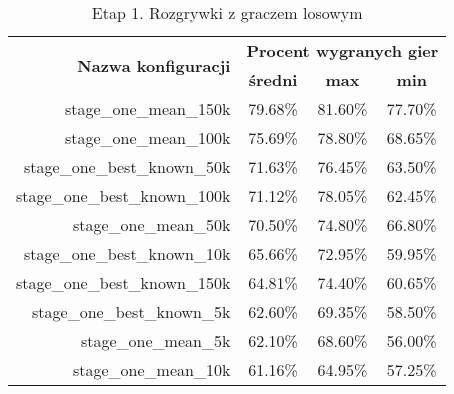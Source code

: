 \begin{longtable}[c]{|r|c|c|c|}
\caption{\label{tab:results/stage_one_all_with_random}Etap 1. Rozgrywki z graczem losowym} \\
\hline

\multirow{2}{*}{\textbf{Nazwa konfiguracji}} & \multicolumn{3}{|c|}{\textbf{Procent wygranych gier}} \\
\cline{2-4}
&\textbf{średni} & \textbf{max} & \textbf{min} \\
\hline
stage\_one\_mean\_150k & 79.68\% & 81.60\% & 77.70\% \\
\hline
stage\_one\_mean\_100k & 75.69\% & 78.80\% & 68.65\% \\
\hline
stage\_one\_best\_known\_50k & 71.63\% & 76.45\% & 63.50\% \\
\hline
stage\_one\_best\_known\_100k & 71.12\% & 78.05\% & 62.45\% \\
\hline
stage\_one\_mean\_50k & 70.50\% & 74.80\% & 66.80\% \\
\hline
stage\_one\_best\_known\_10k & 65.66\% & 72.95\% & 59.95\% \\
\hline
stage\_one\_best\_known\_150k & 64.81\% & 74.40\% & 60.65\% \\
\hline
stage\_one\_best\_known\_5k & 62.60\% & 69.35\% & 58.50\% \\
\hline
stage\_one\_mean\_5k & 62.10\% & 68.60\% & 56.00\% \\
\hline
stage\_one\_mean\_10k & 61.16\% & 64.95\% & 57.25\% \\
\hline
\end{longtable}
